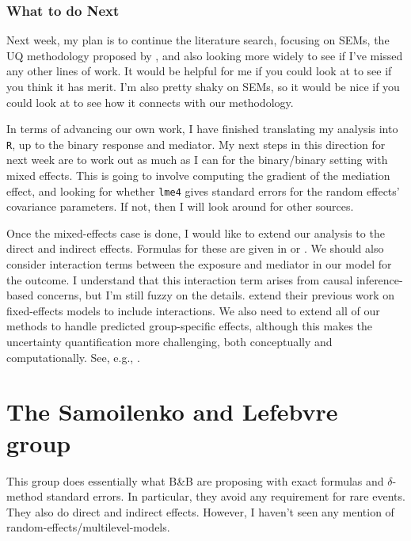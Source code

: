 \documentclass{report}
\begin{document}
\subsubsection{What to do Next}

Next week, my plan is to continue the literature search, focusing on SEMs, the UQ methodology proposed by \citet{Zhe21}, and also looking more widely to see if I've missed any other lines of work. It would be helpful for me if you could look at \citet{Zhe21} to see if you think it has merit. I'm also pretty shaky on SEMs, so it would be nice if you could look at \citet{Zig19} to see how it connects with our methodology.

In terms of advancing our own work, I have finished translating my analysis into \texttt{R}, up to the binary response and mediator. My next steps in this direction for next week are to work out as much as I can for the binary/binary setting with mixed effects. This is going to involve computing the gradient of the mediation effect, and looking for whether \texttt{lme4} gives standard errors for the random effects' covariance parameters. If not, then I will look around for other sources.

Once the mixed-effects case is done, I would like to extend our analysis to the direct and indirect effects. Formulas for these are given in \citet{Sam18} or \citet{Che21}. We should also consider interaction terms between the exposure and mediator in our model for the outcome. I understand that this interaction term arises from causal inference-based concerns, but I'm still fuzzy on the details. \citet{Sam21} extend their previous work on fixed-effects models to include interactions. We also need to extend all of our methods to handle predicted group-specific effects, although this makes the uncertainty quantification more challenging, both conceptually and computationally. See, e.g., \citet{Boo98,Flo19,Zig19}.






\section{The Samoilenko and Lefebvre group}
\label{sec:Sam}

This group does essentially what B\&B are proposing with exact formulas and $\delta$-method standard errors. In particular, they avoid any requirement for rare events. They also do direct and indirect effects. However, I haven't seen any mention of random-effects/multilevel-models.
\end{document}
